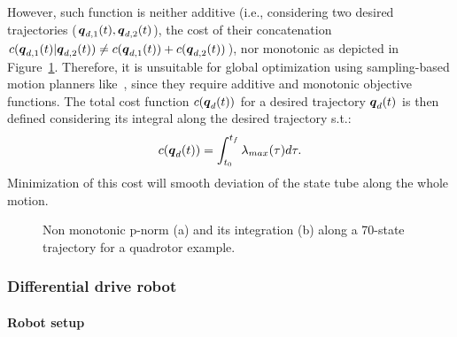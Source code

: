 However, such function is neither additive (i.e., considering two desired trajectories ($\boldsymbol{q}_{d,1}(t), \boldsymbol{q}_{d,2}(t)$), the cost of their concatenation $c(\boldsymbol{q}_{d,1}(t)|\boldsymbol{q}_{d,2}(t)) \neq c(\boldsymbol{q}_{d,1}(t)) + c(\boldsymbol{q}_{d,2}(t))$), nor monotonic as depicted in Figure~\ref{fig:monotonic}.
Therefore, it is unsuitable for global optimization using sampling-based motion planners like~\cite{cRRTstar, cSST}, since they require additive and monotonic objective functions.
The total cost function $c(\boldsymbol{q}_d(t))$ for a desired trajectory $\boldsymbol{q}_d(t)$ is then defined considering its integral along the desired trajectory s.t.:
\begin{equation} \label{eq:cost_function}
    c(\boldsymbol{q}_d(t))=\int_{t_{0}}^{t_{f}}\lambda_{max}(\tau)d\tau.
\end{equation}
Minimization of this cost will smooth deviation of the state tube along the whole motion.

\begin{figure} [htp]
    \centering
    \caption{Non monotonic p-norm (a) and its integration (b) along a 70-state trajectory for a quadrotor example.}%
    \label{fig:monotonic}%
\end{figure}

\subsubsection{Differential drive robot}\label{sec:unic_setup_samp}

\paragraph{Robot setup}

